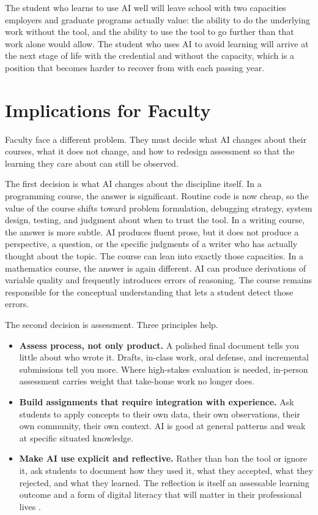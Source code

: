 \documentclass[12pt]{article}
\begin{document}
The student who learns to use AI well will leave school with two capacities employers and graduate programs actually value: the ability to do the underlying work without the tool, and the ability to use the tool to go further than that work alone would allow. The student who uses AI to avoid learning will arrive at the next stage of life with the credential and without the capacity, which is a position that becomes harder to recover from with each passing year.

\section{Implications for Faculty}

Faculty face a different problem. They must decide what AI changes about their courses, what it does not change, and how to redesign assessment so that the learning they care about can still be observed.

The first decision is what AI changes about the discipline itself. In a programming course, the answer is significant. Routine code is now cheap, so the value of the course shifts toward problem formulation, debugging strategy, system design, testing, and judgment about when to trust the tool. In a writing course, the answer is more subtle. AI produces fluent prose, but it does not produce a perspective, a question, or the specific judgments of a writer who has actually thought about the topic. The course can lean into exactly those capacities. In a mathematics course, the answer is again different. AI can produce derivations of variable quality and frequently introduces errors of reasoning. The course remains responsible for the conceptual understanding that lets a student detect those errors.

The second decision is assessment. Three principles help.

\begin{itemize}[leftmargin=*, itemsep=0.3em]
    \item \textbf{Assess process, not only product.} A polished final document tells you little about who wrote it. Drafts, in-class work, oral defense, and incremental submissions tell you more. Where high-stakes evaluation is needed, in-person assessment carries weight that take-home work no longer does.
    \item \textbf{Build assignments that require integration with experience.} Ask students to apply concepts to their own data, their own observations, their own community, their own context. AI is good at general patterns and weak at specific situated knowledge.
    \item \textbf{Make AI use explicit and reflective.} Rather than ban the tool or ignore it, ask students to document how they used it, what they accepted, what they rejected, and what they learned. The reflection is itself an assessable learning outcome and a form of digital literacy that will matter in their professional lives \citep{mollick2024cointelligence}.
\end{itemize}
\end{document}
